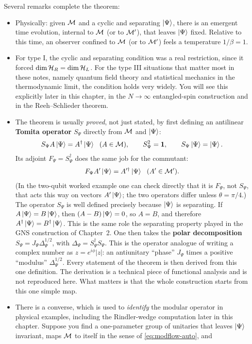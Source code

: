 Several remarks complete the theorem:
\begin{itemize}
\item[(a)] Physically: given $\mathcal{M}$ and a cyclic and separating $\ket\Psi$, there is an emergent time evolution,
internal to $\mathcal{M}$ (or to $\mathcal{M}'$), that leaves $\ket\Psi$ fixed. Relative to this time, an observer confined to
$\mathcal{M}$ (or to $\mathcal{M}'$) feels a temperature $1/\beta=1$.
\item[(b)] For type I, the cyclic and separating condition was a real restriction, since it forced
$\dim\mathcal{H}_R=\dim\mathcal{H}_L$. For the type III situations that matter most in these notes, namely quantum field theory
and statistical mechanics in the thermodynamic limit, the condition holds very widely. You will see this
explicitly later in this chapter, in the $N\to\infty$ entangled-spin construction and in the Reeh--Schlieder
theorem.
\item[(c)] The theorem is usually \emph{proved}, not just stated, by first defining an antilinear
\textbf{Tomita operator} $S_\Psi$ directly from $\mathcal{M}$ and $\ket\Psi$:
\[
S_\Psi A\ket\Psi = A^\dagger\ket\Psi\ \ (A\in\mathcal{M}), \qquad
S_\Psi^2=\mathbf{1}, \qquad S_\Psi\ket\Psi=\ket\Psi .
\]
Its adjoint $F_\Psi=S_\Psi^\dagger$ does the same job for the commutant:
\[
F_\Psi A'\ket\Psi = A'^\dagger\ket\Psi\ \ (A'\in\mathcal{M}') .
\]
(In the two-qubit worked example one can check directly that it is $F_\Psi$, not $S_\Psi$, that acts this way
on vectors $A'\ket\Psi$; the two operators differ unless $\theta=\pi/4$.) The operator $S_\Psi$ is well
defined precisely because $\ket\Psi$ is separating. If $A\ket\Psi=B\ket\Psi$, then $(A-B)\ket\Psi=0$, so
$A=B$, and therefore $A^\dagger\ket\Psi=B^\dagger\ket\Psi$. This is the same role the separating property played
in the GNS construction of Chapter~2. One then takes the \textbf{polar decomposition}
$S_\Psi=J_\Psi\Delta_\Psi^{1/2}$, with $\Delta_\Psi=S_\Psi^\dagger S_\Psi$. This is the operator analogue of
writing a complex number as $z=e^{i\phi}|z|$: an antiunitary ``phase'' $J_\Psi$ times a positive ``modulus''
$\Delta_\Psi^{1/2}$. Every statement of the theorem is then derived from this one definition. The derivation is
a technical piece of functional analysis and is not reproduced here. What matters is that the whole
construction starts from this one simple map.
\item[(d)] There is a converse, which is used to \emph{identify} the modular operator in physical examples,
including the Rindler-wedge computation later in this chapter. Suppose you find a one-parameter group of
unitaries that leaves $\ket\Psi$ invariant, maps $\mathcal{M}$ to itself in the sense of \eqref{eq:modflow-auto}, and

\end{itemize}
